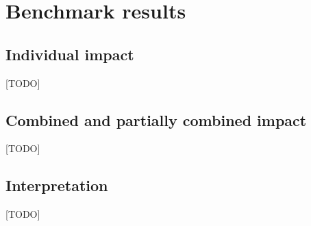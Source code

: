 
\section{Benchmark results} \label{results}
\subsection{Individual impact}
[TODO]
\subsection{Combined and partially combined impact}
[TODO]
\subsection{Interpretation}
[TODO]
